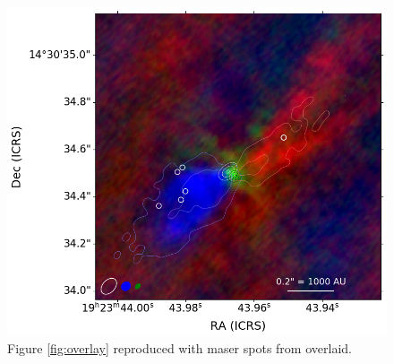 \documentclass[twocolumn]{aastex62}
\begin{document}
\begin{figure}[htp]
    \includegraphics[width=\textwidth]{figures/W51e2e_sio_outflow_with_CS_contours_and_H2O.png}
    \caption{Figure \ref{fig:overlay} reproduced with \water maser spots from \citet{Sato2010a}
    overlaid.
    }
    \label{fig:wateroverlay}
\end{figure}



\end{document}
